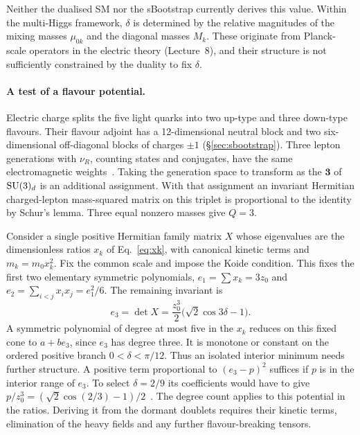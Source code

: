 \documentclass[11pt,a4paper]{article}
\begin{document}
Neither the dualised SM nor the sBootstrap currently derives
this value.  Within the multi-Higgs framework, $\delta$ is
determined by the relative magnitudes of the mixing masses
$\mu_{0k}$ and the diagonal masses $M_k$.  These originate
from Planck-scale operators in the electric theory
(Lecture~8), and their structure is not sufficiently
constrained by the duality to fix $\delta$.

\paragraph{A test of a flavour potential.}
Electric charge splits the five light quarks into two up-type and
three down-type flavours.  Their flavour adjoint has a 12-dimensional
neutral block and two six-dimensional off-diagonal blocks of charges
$\pm1$ (\S\ref{sec:sbootstrap}).  Three
lepton generations with $\nu_R$, counting states and conjugates,
have the same electromagnetic weights~\cite{ConnesKK52}.  Taking the
generation space to transform as the $\mathbf 3$ of $\mathrm{SU}(3)_d$ is an
additional assignment.  With that assignment an invariant Hermitian
charged-lepton mass-squared matrix on this triplet is proportional
to the identity by Schur's lemma.  Three equal nonzero masses give $Q=3$.

Consider a single positive Hermitian family matrix $X$ whose
eigenvalues are the dimensionless ratios $x_k$ of Eq.~\eqref{eq:xk},
with canonical kinetic terms and $m_k=m_0 x_k^2$.  Fix the common
scale and impose the Koide condition.  This fixes the first two
elementary symmetric polynomials, $e_1=\sum x_k=3z_0$ and
$e_2=\sum_{i<j}x_ix_j=e_1^2/6$.  The remaining invariant is
\begin{equation}
 e_3=\det X=\frac{z_0^3}{2}\bigl(\sqrt{2}\cos 3\delta-1\bigr).
 \label{eq:phase-invariant}
\end{equation}
A symmetric polynomial of degree at most five in the $x_k$ reduces
on this fixed cone to $a+b e_3$, since $e_3$ has degree three.
It is monotone or constant on the ordered positive branch
$0<\delta<\pi/12$.  Thus an isolated interior minimum needs further
structure.  A positive term proportional to $(e_3-p)^2$ suffices if
$p$ is in the interior range of $e_3$.  To select $\delta=2/9$ its
coefficients would have to give
$p/z_0^3=(\sqrt{2}\cos(2/3)-1)/2$~\cite{AlphaVacuum}.
The degree count applies to this potential in the ratios.  Deriving
it from the dormant doublets requires their kinetic terms, elimination
of the heavy fields and any further flavour-breaking tensors.
\end{document}
